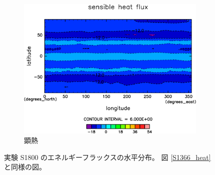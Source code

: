 \documentclass[body]{subfiles}
\begin{document}
\begin{figure}[t]
\begin{subfigure}{.4\textwidth}
		\includegraphics[width=\columnwidth]{S1800/Sens,time=3650:4015-crop-rotate.pdf}
		\caption{顕熱\hmu*{[W/m^{-2}]}}\label{S1800顕熱}
	\end{subfigure}
	\caption[実験 S1800 のエネルギーフラックスの水平分布]{
		実験 S1800 のエネルギーフラックスの水平分布。
		図 \ref{S1366_heat} と同様の図。
	}\label{S1800_heat}
\end{figure}
\end{document}
